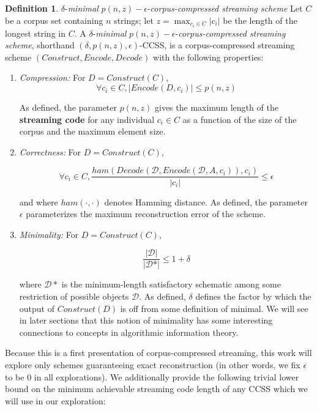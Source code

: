 \documentclass{article}
\theoremstyle{definition}
\newtheorem{definition}{Definition}[section]
\begin{document}
\theoremstyle{definition}
\begin{definition}{$\delta$-\textit{minimal} $p(n,z)-\epsilon$-\textit{corpus-compressed streaming scheme}}
Let $C$ be a corpus set containing $n$ strings; let $z = \max_{c_i \in C} \lvert c_i \rvert$ be 
the length of the longest string in $C$.  A $\delta$-\textit{minimal} $p(n,z)-\epsilon$-\textit{corpus-compressed streaming scheme}, shorthand $(\delta, p(n,z), \epsilon)$-CCSS, is a corpus-compressed streaming 
scheme $(Construct, Encode, Decode)$ with the following properties:

\begin{enumerate}
\item{\textit{Compression: } For $D = Construct(C)$,
\[\forall c_i \in C, \lvert Encode(D, c_i) \rvert \leq p(n,z)\]

\noindent As defined, the parameter $p(n,z)$ gives the maximum length of the \textbf{streaming code} 
for any individual $c_i \in C$ as a function of the size of the corpus and the maximum element size.}
\item{\textit{Correctness: } For $D = Construct(C)$,

\[ \forall c_i \in C, \frac{ham(Decode(\mathcal{D},Encode(\mathcal{D}, A, c_i)), c_i)}{\lvert c_i \rvert} \leq \epsilon \]

\noindent and where $ham(\cdot, \cdot)$ denotes Hamming distance.  As defined, the parameter $\epsilon$ 
parameterizes the maximum reconstruction error of the scheme.}
\item{\textit{Minimality: } For $D = Construct(C)$, 

\[ \frac{\lvert \mathcal{D} \rvert}{\lvert \mathcal{D}* \rvert} \leq 1 + \delta \] 

\noindent where $\mathcal{D}*$ is the minimum-length satisfactory schematic among some restriction of possible objects $\mathcal{D}$.  As defined, $\delta$ defines the factor by which the output of $Construct(D)$ is 
off from some definition of minimal.  We will see in later sections that this notion of minimality has 
some interesting connections to concepts in algorithmic information theory.}
\end{enumerate}

\end{definition}

\noindent Because this is a first presentation of corpus-compressed streaming, this work 
will explore only schemes guaranteeing exact reconstruction (in other words, we fix $\epsilon$ to 
be 0 in all explorations).  We additionally provide the following trivial lower bound on the 
minimum achievable streaming code length of any CCSS which we will use in our exploration:
\end{document}
